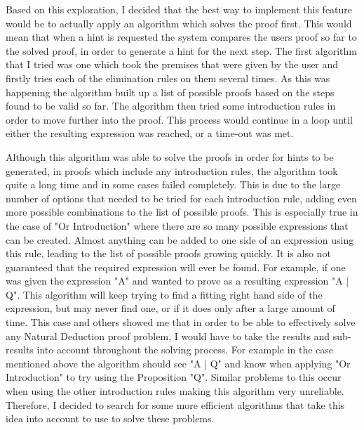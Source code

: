Based on this exploration, I decided that the best way to implement this feature would be to actually apply an algorithm which solves the proof first. This would mean that when a hint is requested the system compares the users proof so far to the solved proof, in order to generate a hint for the next step. The first algorithm that I tried was one which took the premises that were given by the user and firstly tries each of the elimination rules on them several times. As this was happening the algorithm built up a list of possible proofs based on the steps found to be valid so far. The algorithm then tried some introduction rules in order to move further into the proof. This process would continue in a loop until either the resulting expression was reached, or a time-out was met. 

Although this algorithm was able to solve the proofs in order for hints to be generated, in proofs which include any introduction rules, the algorithm took quite a long time and in some cases failed completely. This is due to the large number of options that needed to be tried for each introduction rule, adding even more possible combinations to the list of possible proofs. This is especially true in the case of "Or Introduction" where there are so many possible expressions that can be created. Almost anything can be added to one side of an expression using this rule, leading to the list of possible proofs growing quickly. It is also not guaranteed that the required expression will ever be found. For example, if one was given the expression "A" and wanted to prove as a resulting expression "A | Q". This algorithm will keep trying to find a fitting right hand side of the expression, but may never find one, or if it does only after a large amount of time. This case and others showed me that in order to be able to effectively solve any Natural Deduction proof problem, I would have to take the results and sub-results into account throughout the solving process. For example in the case mentioned above the algorithm should see "A | Q" and know when applying "Or Introduction" to try using the Proposition "Q". Similar problems to this occur when using the other introduction rules making this algorithm very unreliable. Therefore, I decided to search for some more efficient algorithms that take this idea into account to use to solve these problems.


